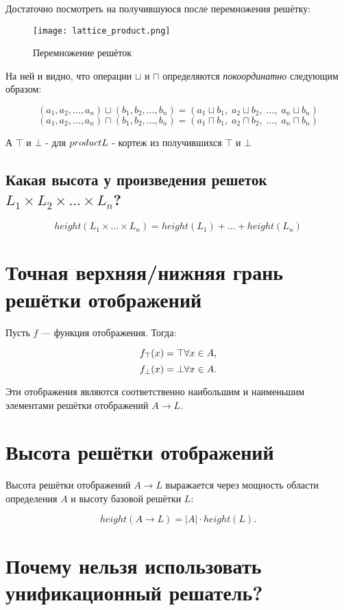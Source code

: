 \documentclass{report}
\begin{document}
Достаточно посмотреть на получившуюся после перемножения решётку:

\begin{figure}[h]
    \centering
    \texttt{[image: lattice\_product.png]}
    \caption{Перемножение решёток}
    \label{fig:latproduct}
\end{figure}

На ней и видно, что операции $\sqcup$ и $\sqcap$ определяются \textit{покоординатно} следующим образом:

$$
(a_1, a_2, \dots, a_n) \sqcup (b_1, b_2, \dots, b_n) = (a_1 \sqcup b_1,\; a_2 \sqcup b_2,\; \dots,\; a_n \sqcup b_n)
$$
$$
(a_1, a_2, \dots, a_n) \sqcap (b_1, b_2, \dots, b_n) = (a_1 \sqcap b_1,\; a_2 \sqcap b_2,\; \dots,\; a_n \sqcap b_n)
$$

А $\top$ и $\bot$ - для $product \space L$ - кортеж из получившихся $\top$ и $\bot$

\subsection{Какая высота у произведения решеток $L_1 \times L_2 \times . . . \times L_n$?}

\[
{height}(L_1 \times \dots \times L_n) =
{height}(L_1) + \dots + {height}(L_n)
\]

\section{Точная верхняя/нижняя грань решётки отображений}

Пусть $ f $ — функция отображения. Тогда:

$$
f_\top(x) = \top \space \forall x \in A,
$$
$$
f_\bot(x) = \bot \space \forall x \in A.
$$

Эти отображения являются соответственно наибольшим и наименьшим элементами решётки отображений $ A \to L $.

\section{Высота решётки отображений}

Высота решётки отображений $ A \to L $ выражается через мощность области определения $ A $ и высоту базовой решётки $ L $:

$$
{height}(A \to L) = |A| \cdot{height}(L).
$$

\section{Почему нельзя использовать унификационный решатель?}
\end{document}
